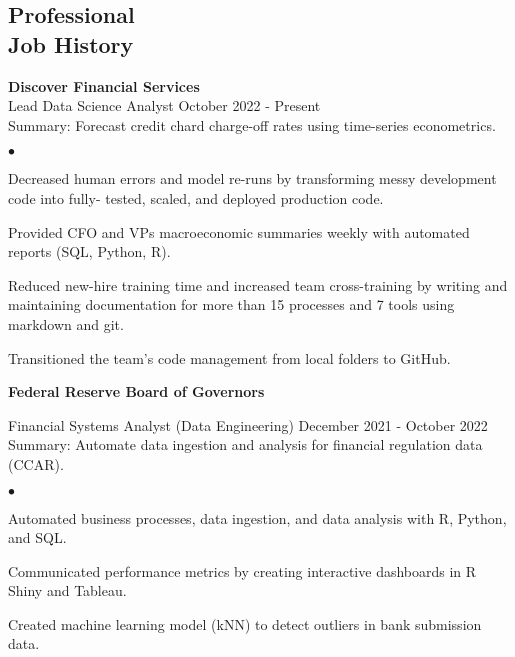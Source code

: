 \documentclass[margin, line]{res}
\newenvironment{list2}{
  \begin{list}{$\bullet$}{%
      \setlength{\itemsep}{0.04in}
      \setlength{\parsep}{0in} \setlength{\parskip}{0in}
      \setlength{\topsep}{0.05in} \setlength{\partopsep}{0in} 
      \setlength{\leftmargin}{\dimexpr 26pt-0.05in}}}
    {\end{list}}
\begin{document}
\begin{resume}
\vspace{-.35cm}


\section{\sc Professional \\ Job History }

{\bf Discover Financial Services}\\

\vspace{-.65cm}
Lead Data Science Analyst \hfill October 2022 - Present\\
\hspace*{3mm} 
    Summary: Forecast credit chard charge-off rates using time-series econometrics.
\hspace*{3mm}
    \begin{list2}
        \item Decreased human errors and model re-runs by transforming messy development code into fully- tested, scaled, and deployed production code.
        \item Provided CFO and VPs macroeconomic summaries weekly with automated reports (SQL, Python, R).
        \item Reduced new-hire training time and increased team cross-training by writing and maintaining documentation for more than 15 processes and 7 tools using markdown and git.
        \item Transitioned the team's code management from local folders to GitHub.
    \end{list2}

{\bf Federal Reserve Board of Governors}\\

\vspace{-.65cm}

Financial Systems Analyst (Data Engineering) \hfill December 2021 - October 2022\\
\hspace*{3mm} 
    Summary: Automate data ingestion and analysis for financial regulation data (CCAR).
\hspace*{3mm}
    \begin{list2}
        \item Automated business processes, data ingestion, and data analysis with R, Python, and SQL.
        \item Communicated performance metrics by creating interactive dashboards in R Shiny and Tableau.
        \item Created machine learning model (kNN) to detect outliers in bank submission data.
    \end{list2}



\end{resume}
\end{document}
